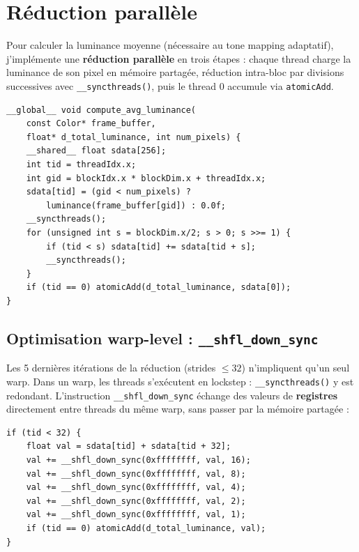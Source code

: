 \documentclass[12pt,a4paper]{article}
\begin{document}
\section{Réduction parallèle}
\label{sec:reduction}

Pour calculer la luminance moyenne (nécessaire au tone mapping adaptatif), j'implémente une \textbf{réduction parallèle} en trois étapes : chaque thread charge la luminance de son pixel en mémoire partagée, réduction intra-bloc par divisions successives avec \texttt{\_\_syncthreads()}, puis le thread 0 accumule via \texttt{atomicAdd}.

\begin{lstlisting}[caption={Kernel de réduction parallèle}]
__global__ void compute_avg_luminance(
    const Color* frame_buffer,
    float* d_total_luminance, int num_pixels) {
    __shared__ float sdata[256];
    int tid = threadIdx.x;
    int gid = blockIdx.x * blockDim.x + threadIdx.x;
    sdata[tid] = (gid < num_pixels) ?
        luminance(frame_buffer[gid]) : 0.0f;
    __syncthreads();
    for (unsigned int s = blockDim.x/2; s > 0; s >>= 1) {
        if (tid < s) sdata[tid] += sdata[tid + s];
        __syncthreads();
    }
    if (tid == 0) atomicAdd(d_total_luminance, sdata[0]);
}
\end{lstlisting}

\subsection{Optimisation warp-level : \texttt{\_\_shfl\_down\_sync}}

Les 5 dernières itérations de la réduction (strides $\leq 32$) n'impliquent qu'un seul warp. Dans un warp, les threads s'exécutent en lockstep : \texttt{\_\_syncthreads()} y est redondant. L'instruction \texttt{\_\_shfl\_down\_sync} échange des valeurs de \textbf{registres} directement entre threads du même warp, sans passer par la mémoire partagée :

\begin{lstlisting}[caption={Réduction warp-level avec \_\_shfl\_down\_sync}]
if (tid < 32) {
    float val = sdata[tid] + sdata[tid + 32];
    val += __shfl_down_sync(0xffffffff, val, 16);
    val += __shfl_down_sync(0xffffffff, val, 8);
    val += __shfl_down_sync(0xffffffff, val, 4);
    val += __shfl_down_sync(0xffffffff, val, 2);
    val += __shfl_down_sync(0xffffffff, val, 1);
    if (tid == 0) atomicAdd(d_total_luminance, val);
}
\end{lstlisting}
\end{document}
